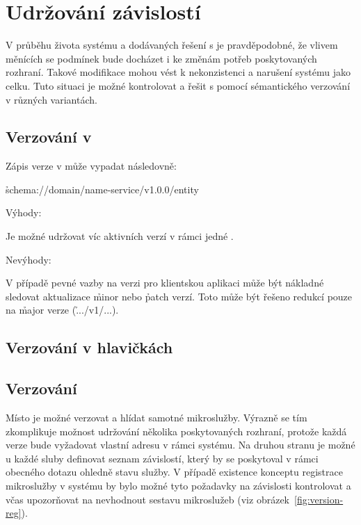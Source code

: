 \section{Udržování závislostí}\label{sec:msa-dependencies}

V průběhu života systému a dodávaných řešení s  je pravděpodobné, že vlivem měnících se podmínek bude docházet i ke změnám potřeb poskytovaných rozhraní.
Takové modifikace mohou vést k nekonzistenci a narušení systému jako celku.
Tuto situaci je možné kontrolovat a řešit s pomocí sémantického verzování v různých variantách.


\subsection{Verzování v }\label{subsec:msa-dependencies-uri}

Zápis verze v  může vypadat následovně:

\h{schema://domain/name-service/v1.0.0/entity}

Výhody:
\begin{ul}
   \item Je možné udržovat víc aktivních  verzí v rámci jedné .
   \item
\end{ul}

Nevýhody:
\begin{ul}
   \item V případě pevné vazby na verzi pro klientskou aplikaci může být nákladné sledovat aktualizace \h{minor} nebo \h{patch} verzí.
   Toto může být řešeno redukcí pouze na \h{major} verze (\h{.../v1/...}).
\end{ul}


\subsection{Verzování v hlavičkách }\label{subsec:msa-dependencies-headers}



\subsection{Verzování }\label{subsec:msa-dependencies-msa}
Místo  je možné verzovat a hlídat samotné mikroslužby.
Výrazně se tím zkomplikuje možnost udržování několika poskytovaných rozhraní, protože každá verze bude vyžadovat vlastní adresu v rámci systému.
Na druhou stranu je možné u každé sluby definovat seznam závislostí, který by se poskytoval v rámci obecného dotazu ohledně stavu služby.
V případě existence konceptu registrace mikroslužby v systému by bylo možné tyto požadavky na závislosti kontrolovat a včas upozorňovat na nevhodnout sestavu mikroslužeb (viz obrázek~\ref{fig:version-reg}).



